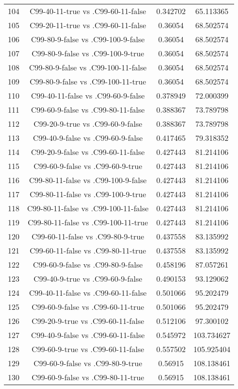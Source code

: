 \documentclass[a4paper,10pt]{article}
\begin{document}
\begin{landscape}
\begin{table}[!htp]
\begin{tabular}{cccc}
104&C99-40-11-true vs .C99-60-11-false&0.342702&65.113365\\
105&C99-20-11-true vs .C99-60-11-false&0.36054&68.502574\\
106&C99-80-9-false vs .C99-100-9-false&0.36054&68.502574\\
107&C99-80-9-false vs .C99-100-9-true&0.36054&68.502574\\
108&C99-80-9-false vs .C99-100-11-false&0.36054&68.502574\\
109&C99-80-9-false vs .C99-100-11-true&0.36054&68.502574\\
110&C99-40-11-false vs .C99-60-9-false&0.378949&72.000399\\
111&C99-60-9-false vs .C99-80-11-false&0.388367&73.789798\\
112&C99-20-9-true vs .C99-60-9-false&0.388367&73.789798\\
113&C99-40-9-false vs .C99-60-9-false&0.417465&79.318352\\
114&C99-20-9-false vs .C99-60-11-false&0.427443&81.214106\\
115&C99-60-9-false vs .C99-60-9-true&0.427443&81.214106\\
116&C99-80-11-false vs .C99-100-9-false&0.427443&81.214106\\
117&C99-80-11-false vs .C99-100-9-true&0.427443&81.214106\\
118&C99-80-11-false vs .C99-100-11-false&0.427443&81.214106\\
119&C99-80-11-false vs .C99-100-11-true&0.427443&81.214106\\
120&C99-60-11-false vs .C99-80-9-true&0.437558&83.135992\\
121&C99-60-11-false vs .C99-80-11-true&0.437558&83.135992\\
122&C99-60-9-false vs .C99-80-9-false&0.458196&87.057261\\
123&C99-40-9-true vs .C99-60-9-false&0.490153&93.129062\\
124&C99-40-11-false vs .C99-60-11-false&0.501066&95.202479\\
125&C99-60-9-false vs .C99-60-11-true&0.501066&95.202479\\
126&C99-20-9-true vs .C99-60-11-false&0.512106&97.300102\\
127&C99-40-9-false vs .C99-60-11-false&0.545972&103.734627\\
128&C99-60-9-true vs .C99-60-11-false&0.557502&105.925404\\
129&C99-60-9-false vs .C99-80-9-true&0.56915&108.138461\\
130&C99-60-9-false vs .C99-80-11-true&0.56915&108.138461\\

\end{tabular}
\end{table}
\end{landscape}
\end{document}

